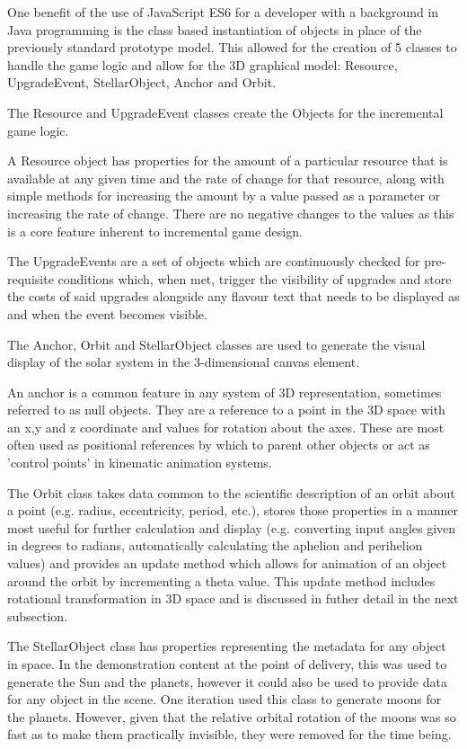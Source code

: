 \documentclass[twoside]{bhamthesis}
\begin{document}
One benefit of the use of JavaScript ES6 for a developer with a background in Java programming is the class based instantiation of objects in place of the previously standard prototype model. This allowed for the creation of 5 classes to handle the game logic and allow for the 3D graphical model: Resource, UpgradeEvent, StellarObject, Anchor and Orbit.

The Resource and UpgradeEvent classes create the Objects for the incremental game logic.

A Resource object has properties for the amount of a particular resource that is available at any given time and the rate of change for that resource, along with simple methods for increasing the amount by a value passed as a parameter or increasing the rate of change. There are no negative changes to the values as this is a core feature inherent to incremental game design.

The UpgradeEvents are a set of objects which are continuously checked for pre-requisite conditions which, when met, trigger the visibility of upgrades and store the costs of said upgrades alongside any flavour text that needs to be displayed as and when the event becomes visible.

The Anchor, Orbit and StellarObject classes are used to generate the visual display of the solar system in the 3-dimensional canvas element.

An anchor is a common feature in any system of 3D representation, sometimes referred to as null objects. They are a reference to a point in the 3D space with an x,y and z coordinate and values for rotation about the axes. These are most often used as positional references by which to parent other objects or act as 'control points' in kinematic animation systems.

The Orbit class takes data common to the scientific description of an orbit about a point (e.g. radius, eccentricity, period, etc.), stores those properties in a manner most useful for further calculation and display (e.g. converting input angles given in degrees to radians, automatically calculating the aphelion and perihelion values) and provides an update method which allows for animation of an object around the orbit by incrementing a theta value. This update method includes rotational transformation in 3D space and is discussed in futher detail in the next subsection.

The StellarObject class has properties representing the metadata for any object in space. In the demonstration content at the point of delivery, this was used to generate the Sun and the planets, however it could also be used to provide data for any object in the scene. One iteration used this class to generate moons for the planets. However, given that the relative orbital rotation of the moons was so fast as to make them practically invisible, they were removed for the time being.
\end{document}
